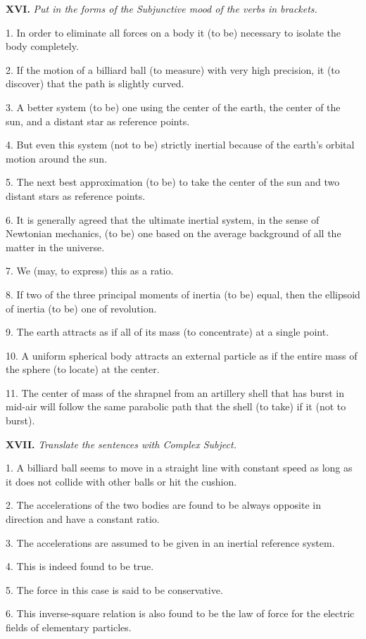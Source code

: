 \documentclass[a4paper]{article}
\newcommand{\ETask}[2]{\medskip\par\textbf{#1.} \textit{#2}\par}
\begin{document}
\ETask{XVI}{Put in the forms of the Subjunctive mood of the verbs in brackets.}

1. In order to eliminate all forces on a body it (to be) necessary to isolate the body completely.

2. If the motion of a billiard ball (to measure) with very high precision, it (to discover) that the path is slightly curved.

3. A better system (to be) one using the center of the earth, the center of the sun, and a distant star as reference points.

4. But even this system (not to be) strictly inertial because of the earth's orbital motion around the sun.

5. The next best approximation (to be) to take the center of the sun and two distant stars as reference points.

6. It is generally agreed that the ultimate inertial system, in the sense of Newtonian mechanics, (to be) one based on the
average background of all the matter in the universe.

7. We (may, to express) this as a ratio.

8. If two of the three principal moments of inertia (to be) equal, then the ellipsoid of inertia (to be) one of revolution.

9. The earth attracts as if all of its mass (to concentrate) at a single point.

10. A uniform spherical body attracts an external particle as if the entire mass of the sphere (to locate) at the center.

11. The center of mass of the shrapnel from an artillery shell that has burst in mid-air will follow the same parabolic path
that the shell (to take) if it (not to burst).

\ETask{XVII}{Translate the sentences with Complex Subject.}

1. A billiard ball seems to move in a straight line with constant speed as long as it does not collide with other balls or
hit the cushion.

2. The accelerations of the two bodies are found to be always opposite in direction and have a constant ratio.

3. The accelerations are assumed to be given in an inertial reference system.

4. This is indeed found to be true.

5. The force in this case is said to be conservative.

6. This inverse-square relation is also found to be the law of force for the electric fields of elementary particles.
\end{document}
